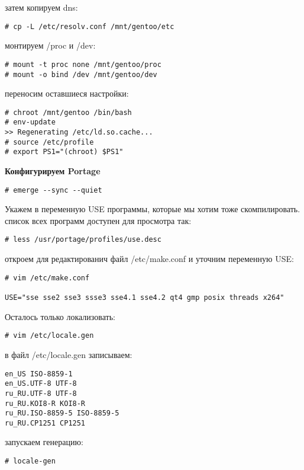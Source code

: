 \documentclass[12pt, a4paper]{article}
\begin{document}
затем копируем dns:

\begin{verbatim}
# cp -L /etc/resolv.conf /mnt/gentoo/etc
\end{verbatim}

монтируем /proc и /dev:

\begin{verbatim}
# mount -t proc none /mnt/gentoo/proc
# mount -o bind /dev /mnt/gentoo/dev
\end{verbatim}

переносим оставшиеся настройки:

\begin{verbatim}
# chroot /mnt/gentoo /bin/bash
# env-update
>> Regenerating /etc/ld.so.cache...
# source /etc/profile
# export PS1="(chroot) $PS1"
\end{verbatim}

{\bf Конфигурируем Portage}

\begin{verbatim}
# emerge --sync --quiet
\end{verbatim}

Укажем в переменную USE программы, которые мы хотим тоже скомпилировать. список всех программ доступен для просмотра так:

\begin{verbatim}
# less /usr/portage/profiles/use.desc
\end{verbatim}

откроем для редактированич файл /etc/make.conf и уточним переменную USE:

\begin{verbatim}
# vim /etc/make.conf

USE="sse sse2 sse3 ssse3 sse4.1 sse4.2 qt4 gmp posix threads x264"
\end{verbatim}

Осталось только локализовать:

\begin{verbatim}
# vim /etc/locale.gen
\end{verbatim}

в файл /etc/locale.gen записываем:

\begin{verbatim}
en_US ISO-8859-1
en_US.UTF-8 UTF-8
ru_RU.UTF-8 UTF-8
ru_RU.KOI8-R KOI8-R
ru_RU.ISO-8859-5 ISO-8859-5
ru_RU.CP1251 CP1251
\end{verbatim}

запускаем генерацию:

\begin{verbatim}
# locale-gen
\end{verbatim}
\end{document}
